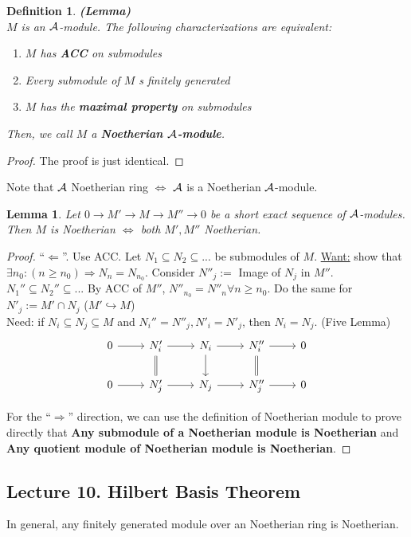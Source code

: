 \documentclass[11pt]{article}
\newtheorem{lemma}[thm]{Lemma}
\newtheorem{dfn}[thm]{Definition}
\newcommand{\cala}{{\cal A}}
\newcommand{\Lrta}{\Longrightarrow}
\newcommand{\lrta}{\longrightarrow}
\newcommand{\Llta}{\Longleftarrow}
\newcommand{\Llrta}{\Longleftrightarrow}
\newcommand{\inj}{\hookrightarrow}
\begin{document}
\begin{dfn}\textbf{(Lemma)}\\
$M$ is an $\cala$-module. The following characterizations are equivalent:
\begin{enumerate}[label=(\alph*)]
\item $M$ has \textbf{ACC} on submodules
\item Every submodule of $M$ s finitely generated
\item $M$ has the \textbf{maximal property} on submodules
\end{enumerate}
Then, we call $M$ a \textbf{Noetherian $\cala$-module}.
\end{dfn}
\begin{proof}
The proof is just identical.
\end{proof}

Note that $\cala$ Noetherian ring $\Llrta $ $\cala$ is a Noetherian $\cala$-module.

\begin{lemma}\label{lem:SES_Noetherian}
Let $0\lrta M'\lrta M\lrta M''\lrta 0$ be a short exact sequence of $\cala$-modules. Then $M$ is Noetherian $\Llrta $ both $M', M''$ Noetherian.
\end{lemma}
\begin{proof}
``$\Llta$''. Use ACC. Let $N_1\subseteq N_2\subseteq ...$ be submodules of $M$. \underline{Want:}  show that $\exists n_0 :(n\geq n_0)\Lrta N_n=N_{n_0}$.
Consider $N''_j:=$ Image of $N_j$ in $M''$. $ N_1''\subseteq N_2''\subseteq ...$ By ACC of $M''$, $N''_{n_0}=N''_{n}\forall n\geq n_0$. Do the same for $N'_j:=M'\cap N_j$ ($M'\inj M$)\\
Need: if $N_i\subseteq N_j\subseteq M$ and $N_i''=N''_j, N'_i=N'_j$, then $N_i=N_j$. (Five Lemma)
\[
\begin{tikzcd}
0\ar[r] & N_i'\ar[r]\ar[d,equal] & N_i\ar[r]\ar[d] & N_i''\ar[r]\ar[d,equal] & 0\\
0\ar[r] & N_j'\ar[r] & N_j\ar[r] & N_j''\ar[r] & 0
\end{tikzcd}
\]

For the ``$\Lrta$'' direction, we can use the definition of Noetherian module to prove directly that \textbf{Any submodule of a Noetherian module is Noetherian} and \textbf{Any quotient module of Noetherian module is Noetherian}.
\end{proof}

\subsection{Lecture 10. Hilbert Basis Theorem}
In general, any finitely generated module over an Noetherian ring is Noetherian.
\end{document}

